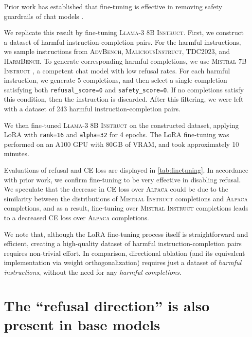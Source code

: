 \documentclass{article}
\begin{document}
Prior work has established that fine-tuning is effective in removing safety guardrails of chat models \citep{yang2023shadow, lermen2023lora, zhan2023removing}.

We replicate this result by fine-tuning \textsc{Llama-3 8B Instruct}.
First, we construct a dataset of harmful instruction-completion pairs.
For the harmful instructions, we sample instructions from \textsc{AdvBench}, \textsc{MaliciousInstruct}, \textsc{TDC2023}, and \textsc{HarmBench}.
To generate corresponding harmful completions, we use \textsc{Mistral 7B Instruct} \citep{jiang2023mistral}, a competent chat model with low refusal rates.
For each harmful instruction, we generate 5 completions, and then select a single completion satisfying both \texttt{refusal\_score=0} and \texttt{safety\_score=0}.
If no completions satisfy this condition, then the instruction is discarded.
After this filtering, we were left with a dataset of 243 harmful instruction-completion pairs.

We then fine-tuned \textsc{Llama-3 8B Instruct} on the constructed dataset, applying LoRA \citep{hu2021lora} with \texttt{rank=16} and \texttt{alpha=32} for 4 epochs.
The LoRA fine-tuning was performed on an A100 GPU with 80GB of VRAM, and took approximately 10 minutes.

Evaluations of refusal and CE loss are displayed in \autoref{tab:finetuning}.
In accordance with prior work, we confirm fine-tuning to be very effective in disabling refusal.
We speculate that the decrease in CE loss over \textsc{Alpaca} could be due to the similarity between the distributions of \textsc{Mistral Instruct} completions and \textsc{Alpaca} completions, and as a result, fine-tuning over \textsc{Mistral Instruct} completions leads to a decreased CE loss over \textsc{Alpaca} completions.

We note that, although the LoRA fine-tuning process itself is straightforward and efficient, creating a high-quality dataset of harmful instruction-completion pairs requires non-trivial effort.
In comparison, directional ablation (and its equivalent implementation via weight orthogonalization) requires just a dataset of \textit{harmful instructions}, without the need for any \textit{harmful completions}.

\clearpage
\section{The ``refusal direction'' is also present in base models}
\end{document}
